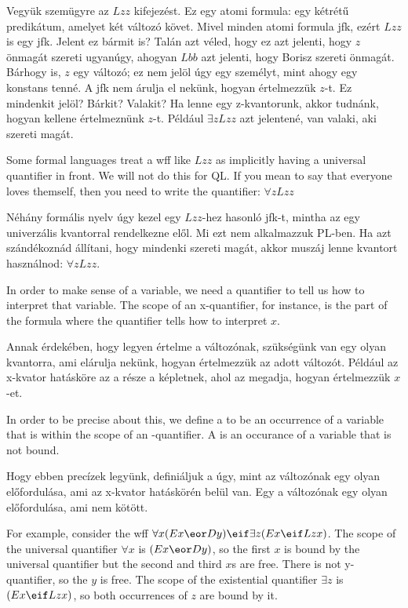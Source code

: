 Vegyük szemügyre az $Lzz$ kifejezést. Ez egy atomi formula: egy kétrétű predikátum, amelyet két változó követ. Mivel minden atomi formula jfk, ezért $Lzz$ is egy jfk. Jelent ez bármit is? Talán azt véled, hogy ez azt jelenti, hogy $z$ önmagát szereti ugyanúgy, ahogyan $Lbb$ azt jelenti, hogy Borisz szereti önmagát. Bárhogy is, $z$ egy változó; ez nem jelöl úgy egy személyt, mint ahogy egy konstans tenné. A jfk nem árulja el nekünk, hogyan értelmezzük $z$-t. Ez mindenkit jelöl? Bárkit? Valakit? Ha lenne egy z-kvantorunk, akkor tudnánk, hogyan kellene értelmeznünk $z$-t. Például $\exists zLzz$ azt jelentené, van valaki, aki szereti magát.

Some formal languages treat a wff like $Lzz$ as implicitly having a universal quantifier in front. We will not do this for QL. If you mean to say that everyone loves themself, then you need to write the quantifier: $\forall zLzz$

Néhány formális nyelv úgy kezel egy $Lzz$-hez hasonló jfk-t, mintha az egy univerzális kvantorral rendelkezne elől. Mi ezt nem alkalmazzuk PL-ben. Ha azt szándékoznád állítani, hogy mindenki szereti magát, akkor muszáj lenne kvantort használnod: $\forall zLzz$.

In order to make sense of a variable, we need a quantifier to tell us how to interpret that variable. The scope of an x-quantifier, for instance, is the part of the formula where the quantifier tells how to interpret $x$.

Annak érdekében, hogy legyen értelme a változónak, szükségünk van egy olyan kvantorra, ami elárulja nekünk, hogyan értelmezzük az adott változót. Például az x-kvator hatásköre az a része a képletnek, ahol az megadja, hogyan értelmezzük $x$-et.

In order to be precise about this, we define a  to be an occurrence of a variable  that is within the scope of an -quantifier. A  is an occurance of a variable that is not bound.

Hogy ebben precízek legyünk, definiáljuk a  úgy, mint az  változónak egy olyan előfordulása, ami az x-kvator hatáskörén belül van. Egy  a változónak egy olyan előfordulása, ami nem kötött.

For example, consider the wff $\forall x(Ex \eor Dy) \eif \exists z(Ex \eif Lzx)$. The scope of the universal quantifier $\forall x$ is $(Ex \eor Dy)$, so the first $x$ is bound by the universal quantifier but the second and third $x$s are free. There is not y-quantifier, so the $y$ is free. The scope of the existential quantifier $\exists z$ is $(Ex \eif Lzx)$, so both occurrences of $z$ are bound by it.

